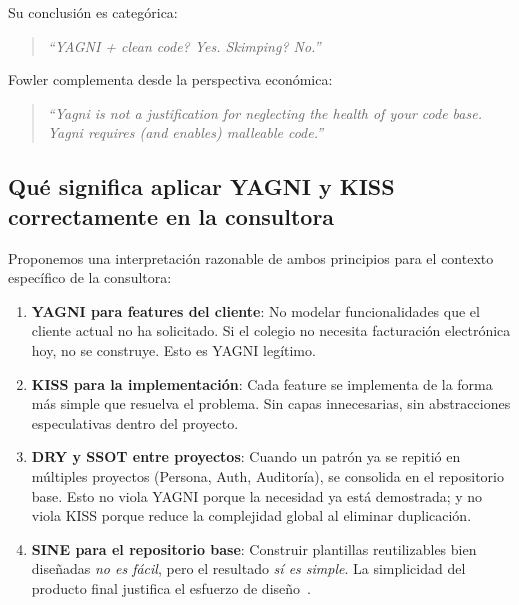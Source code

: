 \documentclass[conference]{IEEEtran}
\begin{document}
Su conclusi\'on es categ\'orica:

\begin{quote}
\textit{``YAGNI + clean code? Yes. Skimping?
No.''}~\cite{jeffries2019}
\end{quote}

Fowler complementa desde la perspectiva econ\'omica:

\begin{quote}
\textit{``Yagni is not a justification for neglecting the health
of your code base. Yagni requires (and enables) malleable
code.''}~\cite{fowler2015yagni}
\end{quote}

\subsection{Qu\'e significa aplicar YAGNI y KISS correctamente en la consultora}

Proponemos una interpretaci\'on razonable de ambos principios
para el contexto espec\'ifico de la consultora:

\begin{enumerate}
  \item \textbf{YAGNI para features del cliente}: No modelar
    funcionalidades que el cliente actual no ha solicitado. Si el
    colegio no necesita facturaci\'on electr\'onica hoy, no se
    construye. Esto es YAGNI leg\'itimo.

  \item \textbf{KISS para la implementaci\'on}: Cada feature se
    implementa de la forma m\'as simple que resuelva el problema.
    Sin capas innecesarias, sin abstracciones especulativas
    dentro del proyecto.

  \item \textbf{DRY y SSOT entre proyectos}: Cuando un patr\'on
    ya se repiti\'o en m\'ultiples proyectos (Persona, Auth,
    Auditor\'ia), se consolida en el repositorio base. Esto no
    viola YAGNI porque la necesidad ya est\'a demostrada; y no
    viola KISS porque reduce la complejidad global al eliminar
    duplicaci\'on.

  \item \textbf{SINE para el repositorio base}: Construir
    plantillas reutilizables bien dise\~nadas \textit{no es
    f\'acil}, pero el resultado \textit{s\'i es simple}. La
    simplicidad del producto final justifica el esfuerzo de
    dise\~no~\cite{sine}.
\end{enumerate}
\end{document}
